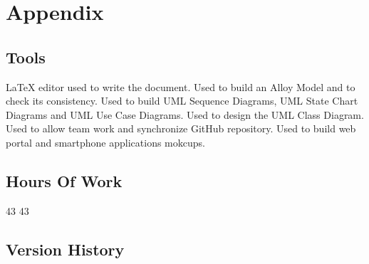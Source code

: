 \section{Appendix}
%
\subsection{Tools}
\begin{itemize}
	 \LaTeX{} editor used to write the document.
	 Used to build an Alloy Model and to check its consistency.
	 Used to build UML Sequence Diagrams, UML State Chart Diagrams and UML Use Case Diagrams.
	 Used to design the UML Class Diagram.
	 Used to allow team work and synchronize GitHub repository.
	 Used to build web portal and smartphone applications mokcups.
\end{itemize}
%
\subsection{Hours Of Work}
\begin{itemize}
	 43
	 43
\end{itemize}
%
\subsection{Version History}
